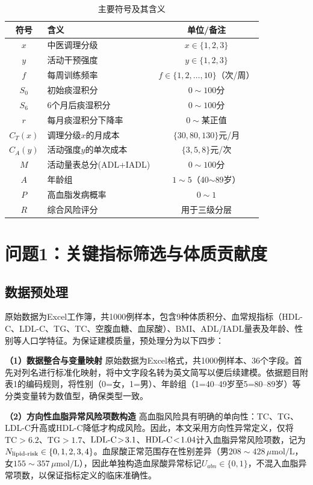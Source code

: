 \documentclass[a4paper,12pt]{ctexart}
\begin{document}
\begin{table}[H]
\centering
\caption{主要符号及其含义}
\begin{tabular}{clc}
\toprule
\textbf{符号} & \textbf{含义} & \textbf{单位/备注} \\
\midrule
$x$ & 中医调理分级 & $x\in\{1,2,3\}$ \\
$y$ & 活动干预强度 & $y\in\{1,2,3\}$ \\
$f$ & 每周训练频率 & $f\in\{1,2,\dots,10\}$（次/周） \\
$S_0$ & 初始痰湿积分 & $0\sim100$分 \\
$S_6$ & 6个月后痰湿积分 & $0\sim100$分 \\
$r$ & 每月痰湿积分下降率 & $0\sim$某正值 \\
$C_T(x)$ & 调理分级$x$的月成本 & $\{30,80,130\}$元/月 \\
$C_A(y)$ & 活动强度$y$的单次成本 & $\{3,5,8\}$元/次 \\
$M$ & 活动量表总分(ADL+IADL) & $0\sim100$分 \\
$A$ & 年龄组 & $1\sim5$（40$\sim$89岁） \\
$P$ & 高血脂发病概率 & $0\sim1$ \\
$R$ & 综合风险评分 & 用于三级分层 \\
\bottomrule
\end{tabular}
\end{table}

\section{问题1：关键指标筛选与体质贡献度}

\subsection{数据预处理}
原始数据为Excel工作簿，共1000例样本，包含9种体质积分、血常规指标（HDL-C、LDL-C、TG、TC、空腹血糖、血尿酸）、BMI、ADL/IADL量表及年龄、性别等人口学特征。为保证建模质量，预处理分为以下四步：

\textbf{（1）数据整合与变量映射}
原始数据为Excel格式，共1000例样本、36个字段。首先对列名进行标准化映射，将中文字段名转为英文简写以便后续建模。依据题目附表1的编码规则，将性别（0=女，1=男）、年龄组（1=40--49岁至5=80--89岁）等分类变量转为数值型，确保类型一致。

\textbf{（2）方向性血脂异常风险项数构造}
高血脂风险具有明确的单向性：TC、TG、LDL-C升高或HDL-C降低才构成风险。因此，本文采用方向性异常定义，仅将$\text{TC}\!>\!6.2$、$\text{TG}\!>\!1.7$、$\text{LDL\text{-}C}\!>\!3.1$、$\text{HDL\text{-}C}\!<\!1.04$计入血脂异常风险项数，记为$N_{\text{lipid\text{-}risk}}\in\{0,1,2,3,4\}$。血尿酸正常范围存在性别差异（男$208\sim428\,\mu\text{mol/L}$，女$155\sim357\,\mu\text{mol/L}$），因此单独构造血尿酸异常标记$U_{abn}\in\{0,1\}$，不混入血脂异常项数，以保证指标定义的临床准确性。
\end{document}
